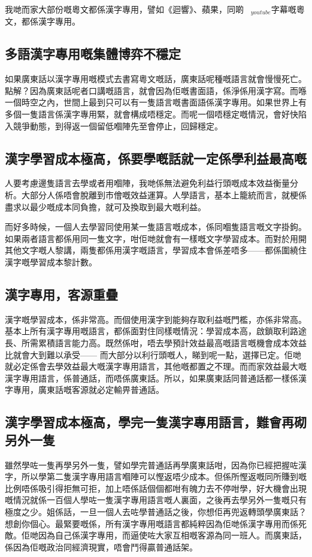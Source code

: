 \documentclass[a5paper, 10pt, openany]{book} %
\begin{document}
我哋而家大部份嘅粵文都係漢字專用，譬如《迴響》、蘋果，同啲$_{youtube}$字幕嘅粵文，都係漢字專用。

\subsection*{多語漢字專用嘅集體博弈不穩定}
如果廣東話以漢字專用嘅模式去書寫粵文嘅話，廣東話呢種嘅語言就會慢慢死亡。點解？因為廣東話呢者口講嘅語言，就會因為佢嘅書面語，係淨係用漢字寫。而喺一個時空之內，世間上最到只可以有一隻語言嘅書面語係漢字專用。如果世界上有多個一隻語言係漢字專用緊，就會構成唔穩定。而呢一個唔穩定嘅情況，會好快陷入競爭動態，到得返一個留低嗰陣先至會停止，回歸穩定。

\subsection*{漢字學習成本極高，係要學嘅話就一定係學利益最高嘅}
人要考慮邊隻語言去學或者用嗰陣，我哋係無法避免利益行頭嘅成本效益衡量分析。大部分人係唔會脫離到市儈嘅效益運算。人學語言，基本上籠統而言，就梗係盡求以最少嘅成本同負擔，就可及換取到最大嘅利益。

而好多時候，一個人去學習同使用某一隻語言嘅成本，係同嗰隻語言嘅文字掛鉤。如果兩者語言都係用同一隻文字，咁佢哋就會有一樣嘅文字學習成本。而對於用開其他文字嘅人黎講，兩隻都係用漢字嘅語言，學習成本會係差唔多——都係圍繞住漢字嘅學習成本黎計數。

\subsection*{漢字專用，客源重疊}

漢字嘅學習成本，係非常高。而個使用漢字到能夠存取利益嘅門檻，亦係非常高。基本上所有漢字專用嘅語言，都係面對住同樣嘅情況：學習成本高，啟鎖取利路途長、所需累積語言能力高。既然係咁，唔去學預計效益最高嘅語言嘅機會成本效益比就會大到難以承受—— 而大部分以利行頭嘅人，睇到呢一點，選擇已定。佢哋就必定係會去學效益最大嘅漢字專用語言，其他嘅都置之不理。而而家效益最大嘅漢字專用語言，係普通話，而唔係廣東話。所以，如果廣東話同普通話都一樣係漢字專用，廣東話嘅客源就必定輸畀普通話。

\subsection*{漢字學習成本極高，學完一隻漢字專用語言，難會再砌另外一隻}
雖然學咗一隻再學另外一隻，譬如學完普通話再學廣東話咁，因為你已經把握咗漢字，所以學第二隻漢字專用語言嗰陣可以慳返唔少成本。但係所慳返嘅同所賺到嘅比例唔係吸引得拒無可拒，加上唔係話個個都咁有魄力去不停咁學，好大機會出現嘅情況就係一百個人學咗一隻漢字專用語言嘅人裏面，之後再去學另外一隻嘅只有極度之少。姐係話，一旦一個人去咗學普通話之後，你想佢再兜返轉頭學廣東話？想創你個心。最緊要嘅係，所有漢字專用嘅語言都純粹因為佢哋係漢字專用而係死敵。佢哋因為自己係漢字專用，而逼使咗大家互相嘅客源為同一班人。而廣東話，係因為佢嘅政治同經濟現實，唔會鬥得贏普通話架。
\end{document}
